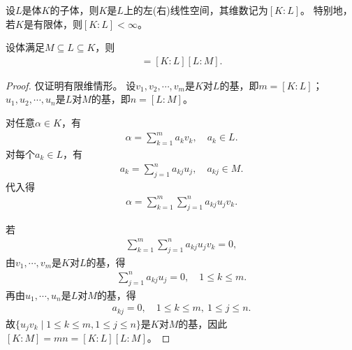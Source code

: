 \documentclass[../../main.tex]{subfiles}%
\begin{document}
\begin{example}
设$L$是体$K$的子体，则$K$是$L$上的左(右)线性空间，其维数记为$[K:L]$。
特别地，若$K$是有限体，则$[K:L]<\infty$。
\end{example}

\begin{theorem}
设体满足$M\subseteq L\subseteq K$，则
\begin{align*}
[K:M]=[K:L][L:M].
\end{align*}
\end{theorem}
\begin{proof}

仅证明有限维情形。
设$v_1,v_2,\cdots,v_m$是$K$对$L$的基，即$m=[K:L]$；$u_1,u_2,\cdots,u_n$是$L$对$M$的基，即$n=[L:M]$。

对任意$\alpha\in K$，有
\begin{align*}
\alpha=\sum\limits_{k=1}^{m}a_kv_k,\quad a_k\in L.
\end{align*}
对每个$a_k\in L$，有
\begin{align*}
a_k=\sum\limits_{j=1}^{n}a_{kj}u_j,\quad a_{kj}\in M.
\end{align*}
代入得
\begin{align*}
\alpha=\sum\limits_{k=1}^{m}\sum\limits_{j=1}^{n}a_{kj}u_jv_k.
\end{align*}

若
\begin{align*}
\sum\limits_{k=1}^{m}\sum\limits_{j=1}^{n}a_{kj}u_jv_k=0,
\end{align*}
由$v_1,\cdots,v_m$是$K$对$L$的基，得
\begin{align*}
\sum\limits_{j=1}^{n}a_{kj}u_j=0,\quad 1\leqslant k\leqslant m.
\end{align*}
再由$u_1,\cdots,u_n$是$L$对$M$的基，得
\begin{align*}
a_{kj}=0,\quad 1\leqslant k\leqslant m,\ 1\leqslant j\leqslant n.
\end{align*}
故$\{u_jv_k\mid 1\leqslant k\leqslant m,1\leqslant j\leqslant n\}$是$K$对$M$的基，因此$[K:M]=mn=[K:L][L:M]$。

\end{proof}
\end{document}
